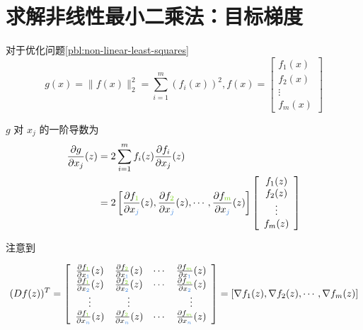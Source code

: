 \section{求解非线性最小二乘法：目标梯度}

对于优化问题\ref{pbl:non-linear-least-squares}
$$ g(x)=\|f(x)\|_{2}^{2}=\sum_{i=1}^{m}\left(f_{i}(x)\right)^{2},f(x)=\left[\begin{array}{c}f_{1}(x) \\ f_{2}(x) \\ \vdots \\ f_{m}(x)\end{array}\right] $$

$ g $ 对 $ x_{j} $ 的一阶导数为
$$\begin{aligned}
    \frac{\partial g}{\partial x_{j}} (z) & =2\sum _{i=1}^{m} f_{i} (z)\frac{\partial f_{i}}{\partial x_{j}} (z)\\
     & =2\left[\frac{\partial f_{\textcolor[rgb]{0.49,0.83,0.13}{1}}}{\partial x_{\textcolor[rgb]{0.29,0.56,0.89}{j}}} (z),\frac{\partial f_{\textcolor[rgb]{0.49,0.83,0.13}{2}}}{\partial x_{\textcolor[rgb]{0.29,0.56,0.89}{j}}} (z),\cdots ,\frac{\partial f_{\textcolor[rgb]{0.49,0.83,0.13}{m}}}{\partial x_{\textcolor[rgb]{0.29,0.56,0.89}{j}}} (z)\right]\left[\begin{array}{ c }
    f_{1} (z)\\
    f_{2} (z)\\
    \vdots \\
    f_{m} (z)
    \end{array}\right]
    \end{aligned}$$

注意到

$$\displaystyle (Df(z))^{T} =\left[\begin{array}{ c c c c }
    \frac{\partial f_{\textcolor[rgb]{0.49,0.83,0.13}{1}}}{\partial x_{\textcolor[rgb]{0.29,0.56,0.89}{1}}} (z) & \frac{\partial f_{\textcolor[rgb]{0.49,0.83,0.13}{2}}}{\partial x_{\textcolor[rgb]{0.29,0.56,0.89}{1}}} (z) & \cdots  & \frac{\partial f_{\textcolor[rgb]{0.49,0.83,0.13}{m}}}{\partial x_{\textcolor[rgb]{0.29,0.56,0.89}{1}}} (z)\\
    \frac{\partial f_{\textcolor[rgb]{0.49,0.83,0.13}{1}}}{\partial x_{\textcolor[rgb]{0.29,0.56,0.89}{2}}} (z) & \frac{\partial f_{\textcolor[rgb]{0.49,0.83,0.13}{2}}}{\partial x_{\textcolor[rgb]{0.29,0.56,0.89}{2}}} (z) & \cdots  & \frac{\partial f_{\textcolor[rgb]{0.49,0.83,0.13}{m}}}{\partial x_{\textcolor[rgb]{0.29,0.56,0.89}{2}}} (z)\\
    \vdots  & \vdots  &  & \vdots \\
    \frac{\partial f_{\textcolor[rgb]{0.49,0.83,0.13}{1}}}{\partial x_{\textcolor[rgb]{0.29,0.56,0.89}{n}}} (z) & \frac{\partial f_{\textcolor[rgb]{0.49,0.83,0.13}{2}}}{\partial x_{\textcolor[rgb]{0.29,0.56,0.89}{n}}} (z) & \cdots  & \frac{\partial f_{\textcolor[rgb]{0.49,0.83,0.13}{m}}}{\partial x_{\textcolor[rgb]{0.29,0.56,0.89}{n}}} (z)
    \end{array}\right] =[ \nabla f_{1} (z),\nabla f_{2} (z),\cdots ,\nabla f_{m} (z)]$$

